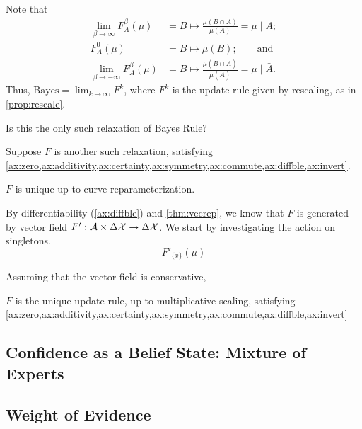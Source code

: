\documentclass{article}
\begin{document}
Note that
\begin{align*}
\lim_{\beta\to\infty} F^\beta_A(\mu) &= B \mapsto \frac{\mu(B \cap A)}{\mu(A)}
   = \mu \mid A; \\
 F^0_A(\mu) &= B \mapsto \mu(B); \qquad\text{and}\\
\lim_{\beta\to-\infty} F^\beta_A(\mu) &= B \mapsto \frac{\mu(B \cap \bar A)}{\mu(\bar A)}
      = \mu \mid \bar A.
\end{align*}
Thus, $\mathrm{Bayes} = \lim_{k \to \infty} F^{k}$, where $F^k$ is the update rule given by rescaling, as in \cref{prop:rescale}.



\begin{wip}
Is this the only such relaxation of Bayes Rule?

Suppose $F$ is another such relaxation, satisfying \cref{ax:zero,ax:additivity,ax:certainty,ax:symmetry,ax:commute,ax:diffble,ax:invert}.

\begin{prop}
    $F$ is unique up to curve reparameterization.
\end{prop}

By differentiability (\cref{ax:diffble}) and \cref{thm:vecrep}, we know that $F$ is generated by vector field $F' : \mathcal A \times \Delta\mathcal X \to \Delta\mathcal X$.
We start by investigating the action on singletons.
\[
    F'_{\{x\}}(\mu)
\]

Assuming that the vector field is conservative,

\begin{conj}
    $F$ is the unique update rule, up to multiplicative scaling, satisfying
    \cref{ax:zero,ax:additivity,ax:certainty,ax:symmetry,ax:commute,ax:diffble,ax:invert}
\end{conj}
\end{wip}


\subsection{Confidence as a Belief State: Mixture of Experts}

\subsection{Weight of Evidence}
\end{document}
